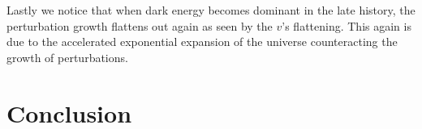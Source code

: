 \documentclass[twocolumn]{aastex62}
\begin{document}
Lastly we notice that when dark energy becomes dominant in the late history, the perturbation growth flattens out again as seen by the $v$'s flattening. This again is due to the accelerated exponential expansion of the universe counteracting the growth of perturbations.


\section{Conclusion} \label{sec:Conclusion}

\newpage


\end{document}
